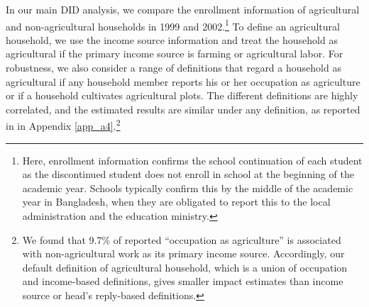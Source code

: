 \documentclass[12pt,letterpaper]{article}
\newcommand{\0}{\ensuremath{\mbox{\boldmath $0$}}}
\begin{document}
In our main DID analysis, we compare the enrollment information of agricultural and non-agricultural households in 1999 and 2002.\footnote{Here, enrollment information confirms the school continuation of each student as the discontinued student does not enroll in school at the beginning of the academic year. Schools typically confirm this by the middle of the academic year in Bangladesh, when they are obligated to report this to the local administration and the education ministry. } To define an agricultural household, we use the income source information and treat the household as agricultural if the primary income source is farming or agricultural labor. For robustness, we also consider a range of definitions that regard a household as agricultural if any household member reports his or her occupation as agriculture or if a household cultivates agricultural plots. The different definitions are highly correlated, and the estimated results are similar under any definition, as reported in in Appendix \ref{app_a4}.\footnote{We found that 9.7\% of reported ``occupation as agriculture'' is associated with non-agricultural work as its primary income source. Accordingly, our default definition of agricultural household, which is a union of occupation and income-based definitions, gives smaller impact estimates than income source or head's reply-based definitions. }
\end{document}
